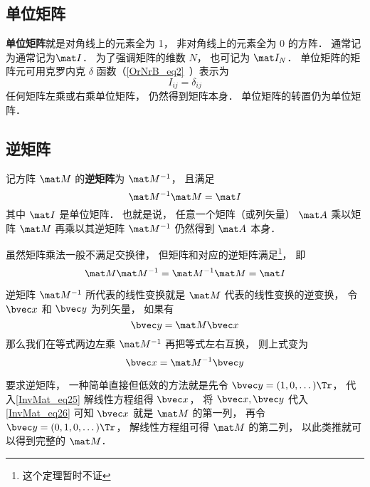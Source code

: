 \subsection{单位矩阵}
\textbf{单位矩阵}就是对角线上的元素全为 1， 非对角线上的元素全为 0 的方阵． 通常记为通常记为$\mat I$． 为了强调矩阵的维数 $N$， 也可记为 $\mat I_N$． 单位矩阵的矩阵元可用克罗内克 $\delta$ 函数（\autoref{OrNrB_eq2}~）表示为
\begin{equation}
I_{ij} = \delta_{ij}
\end{equation} 
任何矩阵左乘或右乘单位矩阵， 仍然得到矩阵本身． 单位矩阵的转置仍为单位矩阵．

\subsection{逆矩阵}
记方阵 $\mat M$ 的\textbf{逆矩阵}为 $\mat M^{-1}$， 且满足
\begin{equation}
\mat M^{-1} \mat M = \mat I
\end{equation}
其中 $\mat I$ 是单位矩阵． 也就是说， 任意一个矩阵（或列矢量） $\mat A$ 乘以矩阵 $\mat M$ 再乘以其逆矩阵 $\mat M^{-1}$ 仍然得到 $\mat A$ 本身．

虽然矩阵乘法一般不满足交换律， 但矩阵和对应的逆矩阵满足\footnote{这个定理暂时不证}， 即
\begin{equation}
\mat M\mat M^{-1} = \mat M^{-1} \mat M = \mat I
\end{equation}

逆矩阵 $\mat M^{-1}$ 所代表的线性变换就是 $\mat M$ 代表的线性变换的逆变换， 令 $\bvec x$ 和 $\bvec y$ 为列矢量， 如果有
\begin{equation}\label{Mat_eq25}
\bvec y = \mat M \bvec x
\end{equation}
那么我们在等式两边左乘 $\mat M^{-1}$ 再把等式左右互换， 则上式变为
\begin{equation}\label{Mat_eq26}
\bvec x = \mat M^{-1} \bvec y
\end{equation}

要求逆矩阵， 一种简单直接但低效的方法就是先令 $\bvec y = (1, 0, \dots)\Tr$， 代入\autoref{InvMat_eq25} 解线性方程组得 $\bvec x$， 将 $\bvec x, \bvec y$ 代入\autoref{InvMat_eq26} 可知 $\bvec x$ 就是 $\mat M$ 的第一列， 再令 $\bvec y = (0, 1, 0, \dots)\Tr$， 解线性方程组可得 $\mat M$ 的第二列， 以此类推就可以得到完整的 $\mat M$．

